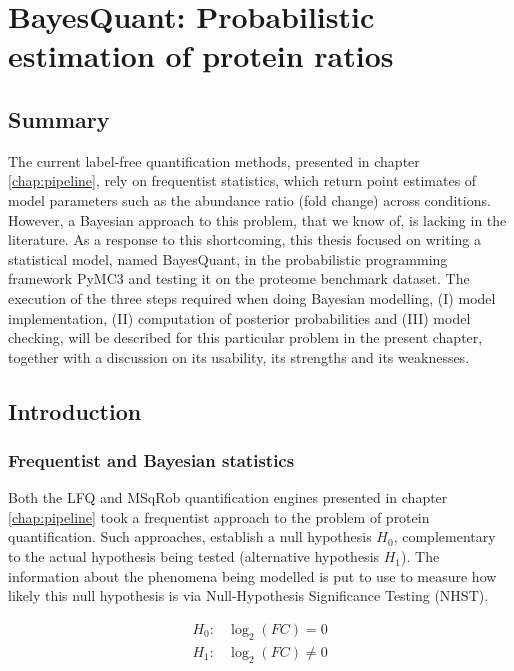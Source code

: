 \chapter{BayesQuant: Probabilistic estimation of protein ratios}
\label{chap:model}

\section*{Summary}

The current label-free quantification methods, presented in chapter \ref{chap:pipeline}, rely on frequentist statistics, which return point estimates of model parameters such as the abundance ratio (fold change) across conditions. However, a Bayesian approach to this problem, that we know of, is lacking in the literature. As a response to this shortcoming, this thesis focused on writing a statistical model, named BayesQuant, in the probabilistic programming framework PyMC3 and testing it on the proteome benchmark dataset. The execution of the three steps required when doing Bayesian modelling, (I) model implementation, (II) computation of posterior probabilities and (III) model checking, will be described for this particular problem in the present chapter, together with a discussion on its usability, its strengths and its weaknesses.

\section{Introduction}

\subsection{Frequentist and Bayesian statistics}

Both the LFQ and MSqRob quantification engines presented in chapter \ref{chap:pipeline} took a frequentist approach to the problem of protein quantification. Such approaches, establish a null hypothesis $H_0$, complementary to the actual hypothesis being tested (alternative hypothesis $H_1$). The information about the phenomena being modelled is put to use to measure how likely this null hypothesis is via Null-Hypothesis Significance Testing (\ac{NHST}).


\begin{align}
H_0: & \log_2(FC) = 0 \nonumber \\
H_1: & \log_2(FC) \neq 0 \nonumber
\end{align}

